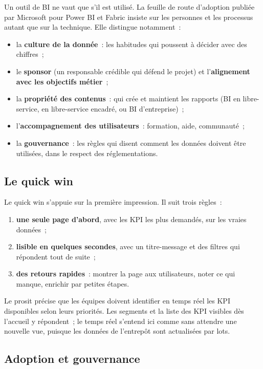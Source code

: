 \noindent Un outil de BI ne vaut que s'il est utilisé. La feuille de route d'adoption publiée par Microsoft pour Power BI et Fabric insiste sur les personnes et les processus autant que sur la technique. Elle distingue notamment~:
\begin{itemize}
	\item la \textbf{culture de la donnée}~: les habitudes qui poussent à décider avec des chiffres~;
	\item le \textbf{sponsor} (un responsable crédible qui défend le projet) et l'\textbf{alignement avec les objectifs métier}~;
	\item la \textbf{propriété des contenus}~: qui crée et maintient les rapports (BI en libre-service, en libre-service encadré, ou BI d'entreprise)~;
	\item l'\textbf{accompagnement des utilisateurs}~: formation, aide, communauté~;
	\item la \textbf{gouvernance}~: les règles qui disent comment les données doivent être utilisées, dans le respect des réglementations.
\end{itemize}

\subsection{Le quick win}

\noindent Le quick win s'appuie sur la première impression. Il suit trois règles~:
\begin{enumerate}
	\item \textbf{une seule page d'abord}, avec les KPI les plus demandés, sur les vraies données~;
	\item \textbf{lisible en quelques secondes}, avec un titre-message et des filtres qui répondent tout de suite~;
	\item \textbf{des retours rapides}~: montrer la page aux utilisateurs, noter ce qui manque, enrichir par petites étapes.
\end{enumerate}

\noindent Le prosit précise que les équipes doivent identifier \og en temps réel\fg{} les KPI disponibles selon leurs priorités. Les segments et la liste des KPI visibles dès l'accueil y répondent~; le \og temps réel\fg{} s'entend ici comme \og sans attendre une nouvelle vue\fg{}, puisque les données de l'entrepôt sont actualisées par lots.

\subsection{Adoption et gouvernance}

